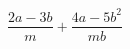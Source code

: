 \begin{ex}
	\begin{condition}
		\( \dfrac{2a-3b}{m}+\dfrac{4a-5b^2}{mb} \)
	\end{condition}
\end{ex}